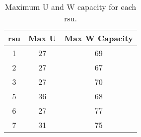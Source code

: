 \begin{table}[ht]
    \centering
    \caption{Maximum U and W capacity for each \gls{rsu}.}
    \begin{tabular}{ccc}
        \hline
        \gls{rsu} & Max U & Max W Capacity \\
        \hline
        1         & 27    & 69             \\
        2         & 27    & 67             \\
        3         & 27    & 70             \\
        5         & 36    & 68             \\
        6         & 27    & 77             \\
        7         & 31    & 75             \\
        \hline
    \end{tabular}
    \label{tab:rsu-max-capacity}
\end{table}